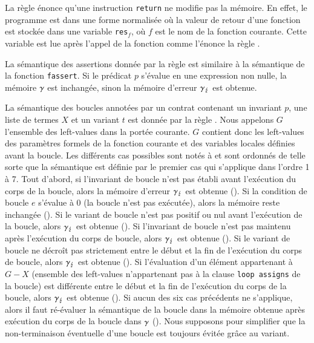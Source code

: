 
La règle  énonce qu'une instruction \lstinline'return' ne
modifie pas la mémoire.
En effet, le programme est dans une forme normalisée où la valeur de retour
d'une fonction est stockée dans une variable \lstinline'res'$_f$, où
$f$ est le nom de la fonction courante.
Cette variable est lue après l'appel de la fonction comme l'énonce la règle
.

La sémantique des assertions \eacsl donnée par la règle  est
similaire à la sémantique de la fonction \lstinline'fassert'.
Si le prédicat $p$ s'évalue en une expression non nulle,
la mémoire $\gamma$ est inchangée, sinon la mémoire d'erreur $\gamma_\lightning$ est
obtenue.

La sémantique des boucles annotées par un contrat contenant un invariant
$p$, une liste de termes $X$ et un variant $t$ est
donnée par la règle .
Nous appelons $G$ l'ensemble des left-values dans la portée courante.
$G$ contient donc les left-values des paramètres formels de la fonction
courante et des variables locales définies avant la boucle.
Les différents cas possibles sont notés  à
 et sont ordonnés de telle sorte que la sémantique est
définie par le premier cas qui s'applique dans l'ordre 1 à 7.
Tout d'abord, si l'invariant de boucle n'est pas établi avant l'exécution du
corps de la boucle, alors la mémoire d'erreur $\gamma_\lightning$ est obtenue
().
Si la condition de boucle $e$ s'évalue à $0$ (la boucle n'est pas exécutée),
alors la mémoire reste inchangée ().
Si le variant de boucle n'est pas positif ou nul avant l'exécution de la boucle,
alors $\gamma_\lightning$ est obtenue ().
Si l'invariant de boucle n'est pas maintenu après l'exécution du corps de
boucle, alors $\gamma_\lightning$ est obtenue ().
Si le variant de boucle ne décroît pas strictement entre le début et la fin de
l'exécution du corps de boucle, alors $\gamma_\lightning$ est obtenue
().
Si l'évaluation d'un élément appartenant à $G-X$ (ensemble des left-values
n'appartenant pas à la clause \lstinline'loop assigns' de la boucle) est
différente entre le début et la fin de l'exécution du corps de la boucle, alors
$\gamma_\lightning$ est obtenue ().
Si aucun des six cas précédents ne s'applique, alors il faut ré-évaluer la
sémantique de la boucle dans la mémoire obtenue après exécution du corps de la
boucle dans $\gamma$ ().
Nous supposons pour simplifier que la non-terminaison éventuelle d'une boucle
est toujours évitée grâce au variant.


